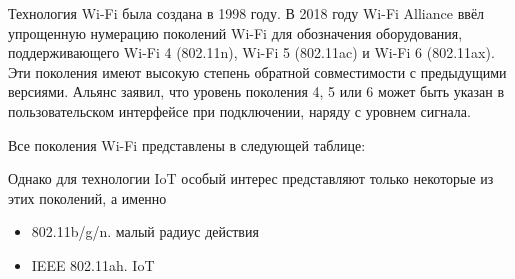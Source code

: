 	Технология Wi-Fi была создана в 1998 году. В 2018 году Wi-Fi Alliance \cite{wi-fi-alliance} ввёл упрощенную 
	нумерацию поколений Wi-Fi для обозначения оборудования, поддерживающего Wi-Fi 4 (802.11n), 
	Wi-Fi 5 (802.11ac) и Wi-Fi 6 (802.11ax). Эти поколения имеют высокую степень обратной совместимости 
	с предыдущими версиями. Альянс заявил, что уровень поколения 4, 5 или 6 может быть указан в 
	пользовательском интерфейсе при подключении, наряду с уровнем сигнала.
	
	Все поколения Wi-Fi представлены в следующей таблице:
	
	
	Однако для технологии IoT особый интерес представляют только некоторые из этих поколений, а именно
	
	\begin{itemize}
		\item 802.11b/g/n. малый радиус действия
		\item IEEE 802.11ah. IoT
	\end{itemize}
	
	
	
	